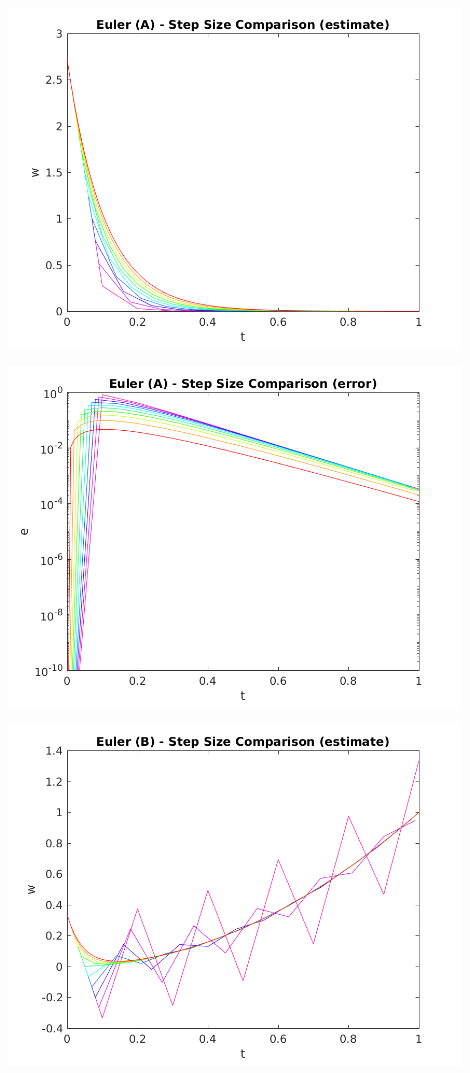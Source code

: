 \documentclass{article}
\begin{document}
\begin{center}
  \includegraphics[width=0.9\textwidth]{../output/a_euler_h_val.png}
  \label{fig:a_euler_h_val}
\end{center}

\begin{center}
  \includegraphics[width=0.9\textwidth]{../output/a_euler_h_err.png}
  \label{fig:a_euler_h_err}
\end{center}

\begin{center}
  \includegraphics[width=0.9\textwidth]{../output/b_euler_h_val.png}
  \label{fig:b_euler_h_val}
\end{center}
\end{document}
